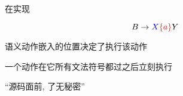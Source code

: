 \begin{frame}{}
  \begin{center}
    在实现
  \end{center}

  \[
    B \to \textcolor{blue}{X} \textcolor{red}{\{a\}} Y
  \]

  \pause
  \vspace{0.80cm}
  \begin{center}
    语义动作嵌入的位置决定了执行该动作

    \vspace{0.60cm}
     一个动作在它所有文法符号都过之后立刻执行
  \end{center}
\end{frame}

\begin{frame}{}
  \begin{center}

    \vspace{0.30cm}
  \end{center}
\end{frame}

\begin{frame}{}
  \begin{center}

    \vspace{0.50cm}
  \end{center}
\end{frame}

\begin{frame}{}
  \begin{center}
    ``源码面前, 了无秘密''


  \end{center}
\end{frame}

